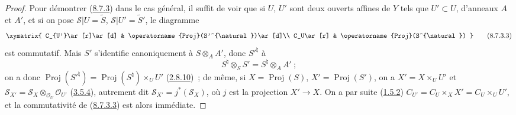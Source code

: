 \begin{proof}
Pour démontrer (\hyperref[II.8.7.3-fr]{8.7.3}) dans le cas général, il suffit
de voir que si $U$, $U'$ sont deux ouverts affines de $Y$ tels que
$U'\subset U$, d'anneaux $A$ et $A'$, et si on pose
$\mathcal{S}|U=\widetilde{S}$, $\mathcal{S}|U'=\widetilde{S}'$, le diagramme
\begin{equation}
\label{II.8.7.3.3-fr}
  \xymatrix{
    C_{U'}\ar[r]\ar[d] & \operatorname{Proj}(S'^{\natural})\ar[d]\\
    C_U\ar[r] & \operatorname{Proj}(S^{\natural})
  }
\tag{8.7.3.3}
\end{equation}
est commutatif. Mais $S'$ s'identifie canoniquement à $S\otimes_A A'$, donc
$S'^{\natural}$ à
\[
  S^{\natural}\otimes_S S'=S^{\natural}\otimes_A A'~;
\]
on a donc
$\operatorname{Proj}(S'^{\natural})=\operatorname{Proj}(S^{\natural})
\times_U U'$ (\hyperref[II.2.8.10-fr]{2.8.10})~; de même, si
$X=\operatorname{Proj}(S)$, $X'=\operatorname{Proj}(S')$, on a
$X'=X\times_U U'$ et
$\mathcal{S}_{X'}=\mathcal{S}_X\otimes_{\mathcal{O}_U}\mathcal{O}_{U'}$
(\hyperref[II.3.5.4-fr]{3.5.4}), autrement dit
$\mathcal{S}_{X'}=j^*(\mathcal{S}_X)$, où $j$ est la projection $X'\to X$.
On a par suite (\hyperref[II.1.5.2-fr]{1.5.2})
$C_{U'}=C_U\times_X X'=C_U\times_U U'$, et la commutativité de
(\hyperref[II.8.7.3.3-fr]{8.7.3.3}) est alors immédiate.
\end{proof}

